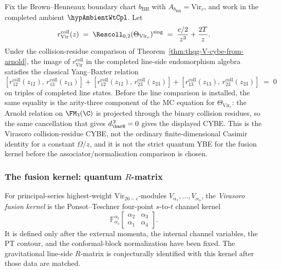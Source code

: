 \begin{proposition}
\label{prop:gravity-ybe}
Fix the Brown--Henneaux boundary chart \(b_{\mathrm{BH}}\) with
\(A_{b_{\mathrm{BH}}}=\mathrm{Vir}_c\), and work in the completed
ambient \(\hypAmbientWtCpl\).  Let
\[
r^{\mathrm{coll}}_{\mathrm{Vir}}(z)
\;=\;
\Rescoll_{0,2}(\Theta_{\mathrm{Vir}_c})^{\mathrm{sing}}
\;=\;
\frac{c/2}{z^3}+\frac{2T}{z}.
\]
Under the collision-residue comparison of
Theorem~\ref{thm:thqg-V-cybe-from-arnold}, the image of
\(r^{\mathrm{coll}}_{\mathrm{Vir}}\) in the completed line-side
endomorphism algebra satisfies the classical Yang--Baxter relation
\[
[r^{\mathrm{coll}}_{12}(z_{12}),\, r^{\mathrm{coll}}_{13}(z_{13})]
+ [r^{\mathrm{coll}}_{12}(z_{12}),\, r^{\mathrm{coll}}_{23}(z_{23})]
+ [r^{\mathrm{coll}}_{13}(z_{13}),\, r^{\mathrm{coll}}_{23}(z_{23})]
\;=\; 0
\]
on triples of completed line states.  Before the line comparison is
installed, the same equality is the arity-three component of the MC
equation for \(\Theta_{\mathrm{Vir}_c}\): the Arnold relation on
\(\FM_3(\C)\) is projected through the binary collision residues, so
the same cancellation that gives \(d_{\barB}^{\,2}=0\) gives the
displayed CYBE.  This is the Virasoro collision-residue CYBE, not the
ordinary finite-dimensional Casimir identity for a constant
\(\Omega/z\), and it is not the strict quantum YBE for the fusion
kernel before the associator/normalisation comparison is chosen.
\end{proposition}

\subsubsection*{The fusion kernel: quantum $R$-matrix}

\begin{definition}
\label{def:gravity-r-matrix}
For principal-series highest-weight $\mathrm{Vir}_{26-c}$-modules
$V_{\alpha_1},\ldots,V_{\alpha_4}$, the \emph{Virasoro fusion kernel}
is the Ponsot--Teschner four-point $s$-to-$t$ channel kernel
\[
\mathbb{F}_{\alpha_s}^{\alpha_t}
\!\left[\begin{smallmatrix}
\alpha_2 & \alpha_3\\
\alpha_1 & \alpha_4
\end{smallmatrix}\right].
\]
It is defined only after the external momenta, the internal channel
variables, the PT contour, and the conformal-block normalization have
been fixed. The gravitational line-side $R$-matrix is conjecturally
identified with this kernel after those data are matched.
\end{definition}

